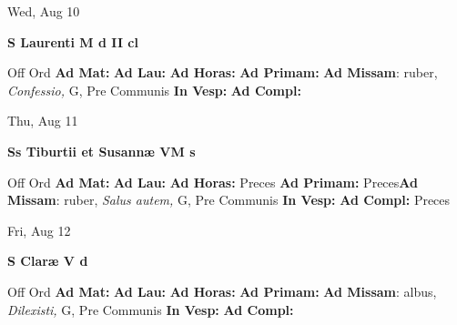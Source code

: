 \documentclass[10pt]{memoir}
\begin{document}
\begin{center}
\begin{minipage}{3.5in}
\vspace{2em}
\begin{center}Wed, Aug 10
\end{center}
\textbf{ \large S Laurenti M
\textnormal{\normalsize d II cl}}

\begin{justify}Off Ord
\textbf{Ad Mat: }
\textbf{Ad Lau: }
\textbf{Ad Horas: }
\textbf{Ad Primam: }\textbf{Ad Missam}: ruber, \textit{Confessio,} G, Pre Communis
\textbf{In Vesp: }
\textbf{Ad Compl: }
\end{justify}
\end{minipage}
\end{center}

\begin{center}
\begin{minipage}{3.5in}
\vspace{2em}
\begin{center}Thu, Aug 11
\end{center}
\textbf{ \large Ss Tiburtii et Susannæ VM
\textnormal{\normalsize s}}

\begin{justify}Off Ord
\textbf{Ad Mat: }
\textbf{Ad Lau: }
\textbf{Ad Horas: }Preces
\textbf{Ad Primam: }Preces\textbf{Ad Missam}: ruber, \textit{Salus autem,} G, Pre Communis
\textbf{In Vesp: }
\textbf{Ad Compl: }Preces
\end{justify}
\end{minipage}
\end{center}

\begin{center}
\begin{minipage}{3.5in}
\vspace{2em}
\begin{center}Fri, Aug 12
\end{center}
\textbf{ \large S Claræ V
\textnormal{\normalsize d}}

\begin{justify}Off Ord
\textbf{Ad Mat: }
\textbf{Ad Lau: }
\textbf{Ad Horas: }
\textbf{Ad Primam: }\textbf{Ad Missam}: albus, \textit{Dilexisti,} G, Pre Communis
\textbf{In Vesp: }
\textbf{Ad Compl: }
\end{justify}
\end{minipage}
\end{center}
\end{document}
